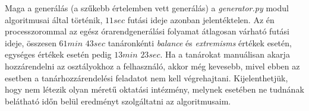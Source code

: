 Maga a generálás (a szűkebb értelemben vett generálás) a \textit{generator.py} modul algoritmusai által történik, $11 sec$ futási ideje azonban jelentéktelen. Az én processzorommal az egész órarendgenerálási folyamat átlagosan várható futási ideje, összesen $61min$ $43sec$ tanáronkénti \textit{balance} és \textit{extremisms} értékek esetén, egységes értékek esetén pedig $13min$ $23sec$. Ha a tanárokat manuálisan akarja hozzárendelni az osztályokhoz a felhasználó, akkor még kevesebb, mivel ebben az esetben a tanárhozzárendelési feladatot nem kell végrehajtani. Kijelenthetjük, hogy nem létezik olyan méretű oktatási intézmény, melynek esetében ne tudnának belátható időn belül eredményt szolgáltatni az algoritmusaim.

